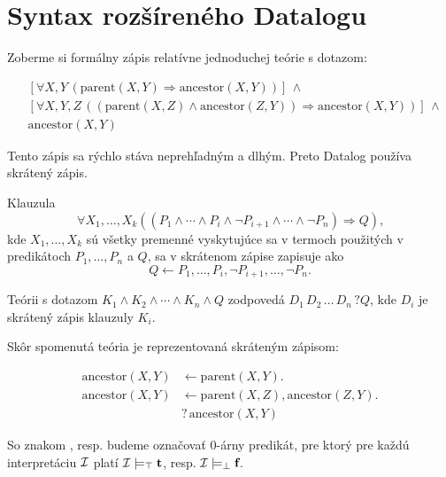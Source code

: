 \section{Syntax rozšíreného Datalogu}
Zoberme si formálny zápis relatívne jednoduchej teórie s dotazom:
\begin{priklad}
    \begin{align*}
        & [\forall X, Y \, (\text{parent}(X, Y) \Rightarrow \text{ancestor}(X, Y))] \, \land\\
        & [\forall X, Y, Z \, ((\text{parent}(X, Z) \land \text{ancestor}(Z, Y)) \Rightarrow \text{ancestor}(X, Y))] \, \land\\
        & \text{ancestor}(X, Y)
    \end{align*}
\end{priklad}

Tento zápis sa rýchlo stáva neprehľadným a dlhým. Preto Datalog používa skrátený zápis. 

Klauzula
$$\forall X_1, \dots, X_k ((P_1 \land \cdots \land P_i \land \lnot P_{i+1} \land \cdots \land \lnot
P_n) \Rightarrow Q)\text{,}$$ kde $X_1, \dots, X_k$ sú všetky premenné vyskytujúce sa v termoch
použitých v predikátoch $P_1, \dots, P_n$ a $Q$, sa v skrátenom zápise zapisuje ako
$$Q \leftarrow P_1, \dots, P_i, \lnot P_{i+1}, \dots, \lnot P_n.$$

Teórii s dotazom $K_1 \land K_2 \land \cdots \land K_n \land Q$ zodpovedá $D_1 \, D_2 \, \dots \,
D_n \, ? Q$, kde $D_i$ je skrátený zápis klauzuly $K_i$.

Skôr spomenutá teória je reprezentovaná skráteným zápisom:
\begin{priklad}
    \begin{align*}
        \text{ancestor}(X, Y) & \leftarrow \text{parent}(X, Y).\\
        \text{ancestor}(X, Y) & \leftarrow \text{parent}(X, Z), \text{ancestor}(Z, Y).\\
        & ? \, \text{ancestor}(X, Y)
    \end{align*}
\end{priklad}

\begin{note}
So znakom \tp, resp. \fp budeme označovať 0-árny predikát, pre ktorý pre každú interpretáciu
$\mathcal{I}$ platí $\mathcal{I} \models_\top \textbf{t}\space$, resp. $\mathcal{I} \models_\bot \textbf{f}\space$.
\end{note}

